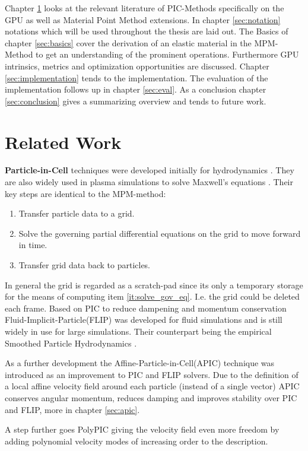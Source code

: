 \documentclass[m,times]{cgMA}
\begin{document}
Chapter \ref{sec:rel_work} looks at the relevant literature of PIC-Methods specifically on the GPU as well as Material Point Method extensions. In chapter \ref{sec:notation} notations which will be used throughout the thesis are laid out. The Basics of chapter \ref{sec:basics} cover the derivation of an elastic material in the MPM-Method to get an understanding of the prominent operations. Furthermore GPU intrinsics, metrics and optimization opportunities are discussed. Chapter \ref{sec:implementation} tends to the implementation. The evaluation of the implementation follows up in chapter \ref{sec:eval}. As a conclusion chapter \ref{sec:conclusion} gives a summarizing overview and tends to future work.

\clearpage
\section{Related Work}\label{sec:rel_work}
\textbf{Particle-in-Cell} techniques were developed initially for hydrodynamics \cite{evans1957particle}. They are also widely used in plasma simulations to solve Maxwell's equations \cite{PIC:GPU}. Their key steps are identical to the MPM-method:
\begin{enumerate}
  \item Transfer particle data to a grid.
\item \label{it:solve_gov_eq}Solve the governing partial differential equations on the grid to move forward in time.
  \item Transfer grid data back to particles.
\end{enumerate}
In general the grid is regarded as a scratch-pad since its only a temporary storage for the means of computing item \ref{it:solve_gov_eq}. I.e. the grid could be deleted each frame. Based on PIC to reduce dampening and momentum conservation Fluid-Implicit-Particle(FLIP) was developed for fluid simulations and is still widely in use for large simulations. Their counterpart being the empirical Smoothed Particle Hydrodynamics \cite{gingold1977smoothed}.

As a further development the Affine-Particle-in-Cell(APIC) technique was introduced as an improvement to PIC and FLIP solvers. Due to the definition of a local affine velocity field around each particle (instead of a single vector) APIC conserves angular momentum, reduces damping and improves stability over PIC and FLIP, more in chapter \ref{sec:apic}. \cite{MPM:APIC} \cite{MPM:OLD_APIC}

A step further goes PolyPIC giving the velocity field even more freedom by adding polynomial velocity modes of increasing order to the description. \cite{MPM:POLYPIC}
\end{document}
